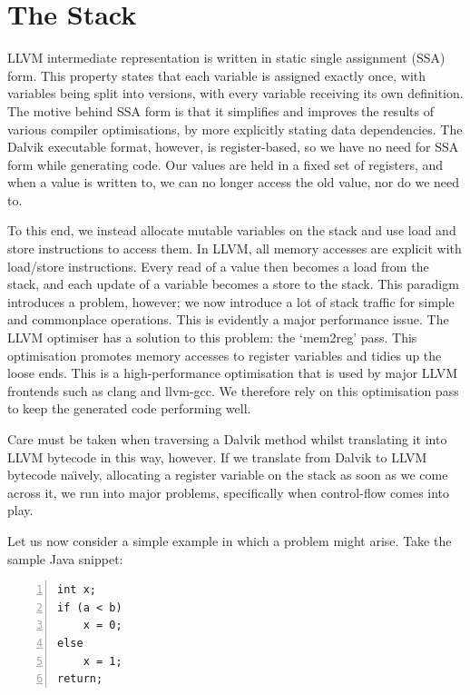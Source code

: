 \section{The Stack}
\label{sec:stack}

LLVM intermediate representation is written in static single assignment (SSA) form. This property states that each variable is assigned exactly once, with variables being split into versions, with every variable receiving its own definition. The motive behind SSA form is that it simplifies and improves the results of various compiler optimisations, by more explicitly stating data dependencies. The Dalvik executable format, however, is register-based, so we have no need for SSA form while generating code. Our values are held in a fixed set of registers, and when a value is written to, we can no longer access the old value, nor do we need to.

To this end, we instead allocate mutable variables on the stack and use load and store instructions to access them. In LLVM, all memory accesses are explicit with load/store instructions. Every read of a value then becomes a load from the stack, and each update of a variable becomes a store to the stack. This paradigm introduces a problem, however; we now introduce a lot of stack traffic for simple and commonplace operations. This is evidently a major performance issue. The LLVM optimiser has a solution to this problem: the `mem2reg' pass. This optimisation promotes memory accesses to register variables and tidies up the loose ends. This is a high-performance optimisation that is used by major LLVM frontends such as clang and llvm-gcc\footnotemark {}. We therefore rely on this optimisation pass to keep the generated code performing well.

Care must be taken when traversing a Dalvik method whilst translating it into LLVM bytecode in this way, however. If we translate from Dalvik to LLVM bytecode na\"{\i}vely, allocating a register variable on the stack as soon as we come across it, we run into major problems, specifically when control-flow comes into play.

Let us now consider a simple example in which a problem might arise. Take the sample Java snippet:

\lstset{
	language=Java,
	basicstyle=\small,
	stringstyle=\ttfamily
}

\begin{lstlisting}[frame=single, numbers=left, numberstyle=\tiny, caption={Java control-flow example}, label=lst:java_br]
int x;
if (a < b)
    x = 0;
else
    x = 1;
return;
\end{lstlisting}

